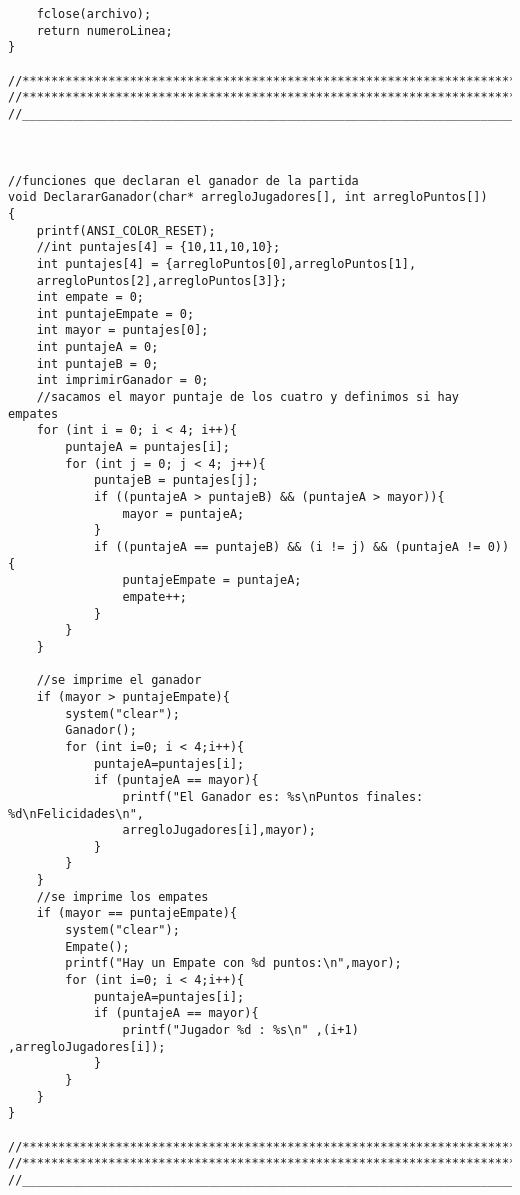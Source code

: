\begin{verbatim}
    fclose(archivo);
    return numeroLinea;
}

//*************************************************************************************
//*************************************************************************************
//_____________________________________________________________________________________



//funciones que declaran el ganador de la partida
void DeclararGanador(char* arregloJugadores[], int arregloPuntos[])
{
    printf(ANSI_COLOR_RESET);
    //int puntajes[4] = {10,11,10,10};
    int puntajes[4] = {arregloPuntos[0],arregloPuntos[1],
    arregloPuntos[2],arregloPuntos[3]};
    int empate = 0;
    int puntajeEmpate = 0;
    int mayor = puntajes[0];
    int puntajeA = 0;
    int puntajeB = 0;
    int imprimirGanador = 0;
    //sacamos el mayor puntaje de los cuatro y definimos si hay empates
    for (int i = 0; i < 4; i++){
        puntajeA = puntajes[i];
        for (int j = 0; j < 4; j++){
            puntajeB = puntajes[j];
            if ((puntajeA > puntajeB) && (puntajeA > mayor)){
                mayor = puntajeA;
            }
            if ((puntajeA == puntajeB) && (i != j) && (puntajeA != 0)){
                puntajeEmpate = puntajeA;
                empate++;
            }
        }
    }

    //se imprime el ganador
    if (mayor > puntajeEmpate){
        system("clear");
        Ganador();
        for (int i=0; i < 4;i++){
            puntajeA=puntajes[i];
            if (puntajeA == mayor){
                printf("El Ganador es: %s\nPuntos finales: %d\nFelicidades\n",
                arregloJugadores[i],mayor);
            }
        }
    }
    //se imprime los empates
    if (mayor == puntajeEmpate){
        system("clear");
        Empate();
        printf("Hay un Empate con %d puntos:\n",mayor);
        for (int i=0; i < 4;i++){
            puntajeA=puntajes[i];
            if (puntajeA == mayor){
                printf("Jugador %d : %s\n" ,(i+1) ,arregloJugadores[i]);
            }
        }
    }   
}

//*************************************************************************************
//*************************************************************************************
//_____________________________________________________________________________________




\end{verbatim}
